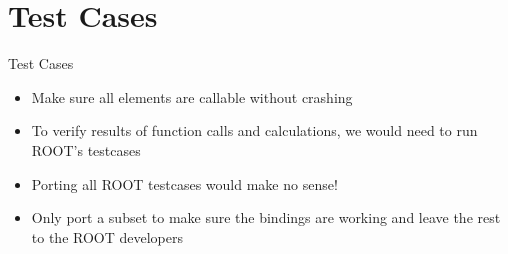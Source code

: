 \section{Test Cases}
\begin{frame}{Test Cases}
  \begin{itemize}
    \item Make sure all elements are callable without crashing
    \item To verify results of function calls and calculations, we would need to run ROOT's testcases
    \item Porting all ROOT testcases would make no sense!
    \item Only port a subset to make sure the bindings are working and leave the rest to the ROOT developers
  \end{itemize}
\end{frame}
